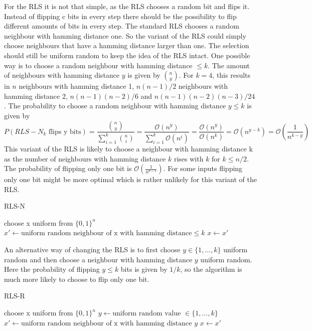 For the RLS it is not that simple, as the RLS chooses a random bit and flips it.
Instead of flipping c bits in every step there should be the possibility to flip different amounts of bits in every step.
The standard RLS chooses a random neighbour with hamming distance one.
So the variant of the RLS could simply choose neighbours that have a hamming distance larger than one.
The selection should still be uniform random to keep the idea of the RLS intact.
One possible way is to choose a random neighbour with hamming distance $\le k$.
The amount of neighbours with hamming distance $y$ is given by $\binom{n}{y}$.
For $k=4$, this results in $n$ neighbours with hamming distance 1, $n(n-1)/2$ neighbours with hamming distance 2, $n(n-1)(n-2)/6$
and $n(n-1)(n-2)(n-3)/24$.
The probability to choose a random neighbour with hamming distance $y \le k$ is given by
\[P(RLS-N_k\text{ flips y bits}) = \frac{\binom{n}{y}}{\sum_{i=1}^k \binom{n}{i}} = \frac{\mathcal{O}(n^y)}{\sum_{i=1}^k \mathcal{O}(n^i)}
      = \frac{\mathcal{O}(n^y)}{\mathcal{O}(n^k)} = \mathcal{O}(n^{y-k}) = \mathcal{O}(\frac{1}{n^{k-y}})\]
This variant of the RLS is likely to choose a neighbour with hamming distance k as the number of neighbours with hamming
distance $k$ rises with $k$ for $k \le n/2$.
The probability of flipping only one bit is $\mathcal{O}(\frac{1}{n^{k-1}})$.
For some inputs flipping only one bit might be more optimal which is rather unlikely for this variant of the RLS.\newline
\begin{algorithm}[bt]
      \caption{\textsc{RLS-N}}\label{alg:rlsN}

      \DontPrintSemicolon %

      \BlankLine
      choose x uniform from ${\{0,1\}}^n$\;
      {
      $x' \leftarrow \text{uniform random neighbour of x with hamming distance} \le k$\;
      {
      {
            $x \leftarrow x'$\;
      }
      }
      }
\end{algorithm}

An alternative way of changing the RLS is to first choose $y \in \{1, \dots, k\}$ uniform random and then choose a neighbour with hamming distance $y$ uniform random.
Here the probability of flipping $y \le k$ bits is given by $1/k$, so the algorithm is much more likely to choose to flip only one bit.

\begin{algorithm}[bt]
      \caption{\textsc{RLS-R}}\label{alg:rlsR}

      \DontPrintSemicolon %

      \BlankLine
      choose x uniform from ${\{0,1\}}^n$\;
      {
      $y \leftarrow \text{uniform random value }\in \{1,\dots,k\}$\;
      $x' \leftarrow \text{uniform random neighbour of x with hamming distance } y$\;
      {
      {
            $x \leftarrow x'$\;
      }
      }
      }
\end{algorithm}

